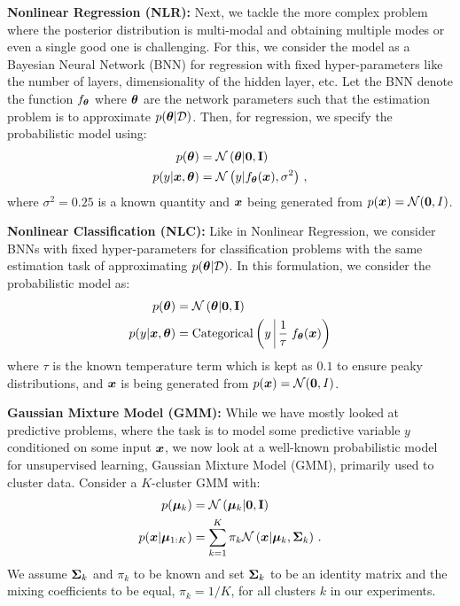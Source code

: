 \textbf{Nonlinear Regression (NLR):}
Next, we tackle the more complex problem where the posterior distribution is multi-modal and obtaining multiple modes or even a single good one is challenging. For this, we consider the model as a Bayesian Neural Network (BNN) for regression with fixed hyper-parameters like the number of layers, dimensionality of the hidden layer, etc. Let the BNN denote the function $f_{\bm{\theta}}$ where ${\bm{\theta}}$ are the network parameters such that the estimation problem is to approximate $p({\bm{\theta}} | {\mathcal{D}})$. Then, for regression, we specify the probabilistic model using:
\begin{align}
    p({\bm{\theta}}) &= {\mathcal{N}}\left({\bm{\theta}} | \mathbf{0}, \mathbf{I}\right)\\
    p(y | {\bm{x}}, {\bm{\theta}}) &= {\mathcal{N}}\left(y | f_{\bm{\theta}}({\bm{x}}), \sigma^2\right) \, ,
\end{align}
where $\sigma^2 = 0.25$ is a known quantity and ${\bm{x}}$ being generated from $p({\bm{x}}) = {\mathcal{N}}(\mathbf{0}, I)$.
 
\textbf{Nonlinear Classification (NLC):}
Like in Nonlinear Regression, we consider BNNs with fixed hyper-parameters for classification problems with the same estimation task of approximating $p({\bm{\theta}} | {\mathcal{D}})$. In this formulation, we consider the probabilistic model as:
\begin{align}
    p(\mtheta) &= \gN\left(\mtheta | \mathbf{0}, \mathbf{I}\right)\\
    p(y | \vx, \mtheta) &= \mathrm{Categorical}\left(y \;\vline\; \frac{1}{\tau}\;f_\mtheta(\vx)\right)
\end{align}
where $\tau$ is the known temperature term which is kept as $0.1$ to ensure peaky distributions, and ${\bm{x}}$ is being generated from $p({\bm{x}}) = {\mathcal{N}}(\mathbf{0}, I)$.

\textbf{Gaussian Mixture Model (GMM):}
While we have mostly looked at predictive problems, where the task is to model some predictive variable $y$ conditioned on some input ${\bm{x}}$, we now look at a well-known probabilistic model for unsupervised learning, Gaussian Mixture Model (GMM), primarily used to cluster data. Consider a $K$-cluster GMM with:
\begin{align}
    p({\bm{\mu}}_k) &= {\mathcal{N}}\left({\bm{\mu}}_k | \mathbf{0}, \mathbf{I}\right)\\
    p({\bm{x}} | {\bm{\mu}}_{1:K}) &= \sum_{k=1}^K \pi_k {\mathcal{N}}\left({\bm{x}} | {\bm{\mu}}_k, {\bm{\Sigma}}_k\right) \, .
\end{align}
 We assume ${\bm{\Sigma}}_k$ and $\pi_k$ to be known and set ${\bm{\Sigma}}_k$ to be an identity matrix and the mixing coefficients to be equal, $\pi_k = 1/K$, for all clusters $k$ in our experiments. 